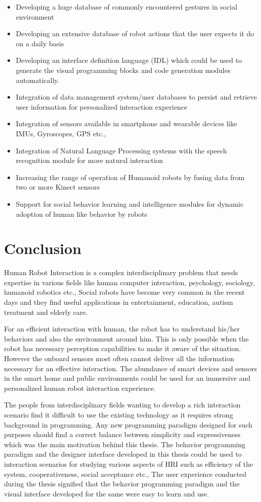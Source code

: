 \begin{itemize}
\item Developing a huge database of commonly encountered gestures in social environment
\item Developing an extensive database of robot actions that the user expects it do on a daily basis
\item Developing an interface definition language (IDL) which could be used to generate the visual programming blocks and code generation modules automatically.
\item Integration of data management system/user databases to persist and retrieve user information for personalized interaction experience
\item Integration of sensors available in smartphone and wearable devices like IMUs, Gyroscopes, GPS etc.,
\item Integration of Natural Language Processing systems with the speech recognition module for more natural interaction
\item Increasing the range of operation of Humanoid robots by fusing data from two or more Kinect sensors 
\item Support for social behavior learning and intelligence modules for dynamic adoption of human like behavior by robots
\end{itemize}

\section{Conclusion} %
Human Robot Interaction is a complex interdisciplinary problem that needs expertise in various fields like human computer interaction, psychology, sociology, humanoid robotics etc., Social robots have become very common in the recent days and they find useful applications in entertainment, education, autism treatment and elderly care. 

For an efficient interaction with human, the robot has to understand his/her behaviors and also the environment around him. This is only possible when the robot has necessary perception capabilities to make it aware of the situation. However the onboard sensors most often cannot deliver all the information necessary for an effective interaction. The abundance of smart devices and sensors in the smart home and public environments could be used for an immersive and personalized human robot interaction experience. 

The people from interdisciplinary fields wanting to develop a rich interaction scenario find it difficult to use the existing technology as it requires strong background in programming. Any new programming paradigm designed for such purposes should find a correct balance between simplicity and expressiveness which was the main motivation behind this thesis. The behavior programming paradigm and the designer interface developed in this thesis could be used to interaction scenarios for studying various aspects of HRI such as efficiency of the system, cooperativeness, social acceptance etc., The user experience conducted during the thesis signified that the behavior programming paradigm and the visual interface developed for the same were easy to learn and use.

